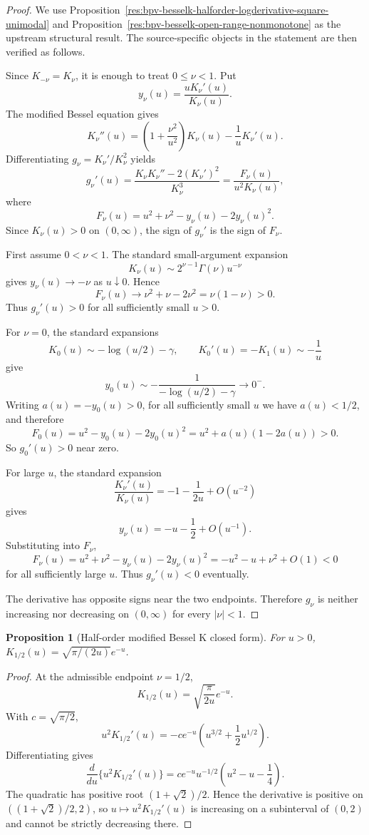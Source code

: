 \documentclass[11pt]{article}
\numberwithin{equation}{section}
\newtheorem{proposition}[theorem]{Proposition}
\theoremstyle{definition}
\theoremstyle{remark}
\newcommand{\1}{\mathbf 1}
\begin{document}
\begin{proof}
We use Proposition~\ref{res:bpv-besselk-halforder-logderivative-square-unimodal} and Proposition~\ref{res:bpv-besselk-open-range-nonmonotone} as the upstream structural result. The source-specific objects in the statement are then verified as follows.

Since \(K_{-\nu}=K_\nu\), it is enough to treat \(0\le\nu<1\). Put
\[
y_\nu(u)=\frac{uK_\nu'(u)}{K_\nu(u)}.
\]
The modified Bessel equation gives
\[
K_\nu''(u)=\left(1+\frac{\nu^2}{u^2}\right)K_\nu(u)-\frac1uK_\nu'(u).
\]
Differentiating \(g_\nu=K_\nu'/K_\nu^2\) yields
\[
g_\nu'(u)=\frac{K_\nu K_\nu''-2(K_\nu')^2}{K_\nu^3}
=\frac{F_\nu(u)}{u^2K_\nu(u)},
\]
where
\[
F_\nu(u)=u^2+\nu^2-y_\nu(u)-2y_\nu(u)^2.
\]
Since \(K_\nu(u)>0\) on \((0,\infty)\), the sign of \(g_\nu'\) is the sign of \(F_\nu\).

First assume \(0<\nu<1\). The standard small-argument expansion
\[
K_\nu(u)\sim 2^{\nu-1}\Gamma(\nu)u^{-\nu}
\]
gives \(y_\nu(u)\to-\nu\) as \(u\downarrow0\). Hence
\[
F_\nu(u)\to \nu^2+\nu-2\nu^2=\nu(1-\nu)>0.
\]
Thus \(g_\nu'(u)>0\) for all sufficiently small \(u>0\).

For \(\nu=0\), the standard expansions
\[
K_0(u)\sim-\log(u/2)-\gamma,\qquad K_0'(u)=-K_1(u)\sim-\frac1u
\]
give
\[
y_0(u)\sim-\frac{1}{-\log(u/2)-\gamma}\to0^-.
\]
Writing \(a(u)=-y_0(u)>0\), for all sufficiently small \(u\) we have \(a(u)<1/2\), and therefore
\[
F_0(u)=u^2-y_0(u)-2y_0(u)^2
=u^2+a(u)(1-2a(u))>0.
\]
So \(g_0'(u)>0\) near zero.

For large \(u\), the standard expansion
\[
\frac{K_\nu'(u)}{K_\nu(u)}
=-1-\frac{1}{2u}+O(u^{-2})
\]
gives
\[
y_\nu(u)=-u-\frac12+O(u^{-1}).
\]
Substituting into \(F_\nu\),
\[
F_\nu(u)
=u^2+\nu^2-y_\nu(u)-2y_\nu(u)^2
=-u^2-u+\nu^2+O(1)<0
\]
for all sufficiently large \(u\). Thus \(g_\nu'(u)<0\) eventually.

The derivative has opposite signs near the two endpoints. Therefore \(g_\nu\) is neither increasing nor decreasing on \((0,\infty)\) for every \(|\nu|<1\).
\end{proof}

\begin{proposition}[Half-order modified Bessel K closed form]
\label{res:halforder-besselk-closedform}
For \(u>0\), \(K_{1/2}(u)=\sqrt{\pi/(2u)}e^{-u}\).
\end{proposition}

\begin{proof}
At the admissible endpoint \(\nu=1/2\),
\[
K_{1/2}(u)=\sqrt{\frac{\pi}{2u}}e^{-u}.
\]
With \(c=\sqrt{\pi/2}\),
\[
u^2K_{1/2}'(u)=-c e^{-u}\left(u^{3/2}+\frac12u^{1/2}\right).
\]
Differentiating gives
\[
\frac{d}{du}\{u^2K_{1/2}'(u)\}
=ce^{-u}u^{-1/2}\left(u^2-u-\frac14\right).
\]
The quadratic has positive root \((1+\sqrt2)/2\). Hence the derivative is positive on \(((1+\sqrt2)/2,2)\), so \(u\mapsto u^2K_{1/2}'(u)\) is increasing on a subinterval of \((0,2)\) and cannot be strictly decreasing there.
\end{proof}
\end{document}
